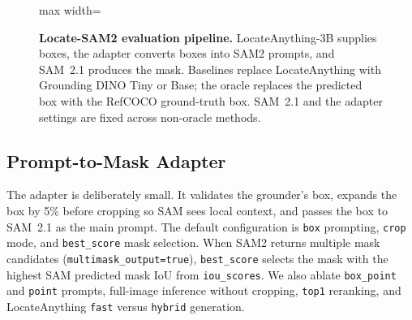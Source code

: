 \documentclass[11pt,a4paper]{article}
\begin{document}
\begin{figure}[t]
  \centering
  \begin{adjustbox}{max width=\textwidth}
  \end{adjustbox}
  \caption{%
    \textbf{Locate-SAM2 evaluation pipeline.}
    LocateAnything-3B supplies boxes, the adapter converts boxes into SAM2 prompts, and SAM~2.1 produces the mask.
    Baselines replace LocateAnything with Grounding DINO Tiny or Base; the oracle replaces the predicted box with the RefCOCO ground-truth box.
    SAM~2.1 and the adapter settings are fixed across non-oracle methods.}
  \label{fig:arch}
\end{figure}

\subsection{Prompt-to-Mask Adapter}
\label{sec:adapter}

The adapter is deliberately small.
It validates the grounder's box, expands the box by 5\% before cropping so SAM sees local context, and passes the box to SAM~2.1 as the main prompt.
The default configuration is \texttt{box} prompting, \texttt{crop} mode, and \texttt{best\_score} mask selection.
When SAM2 returns multiple mask candidates (\texttt{multimask\_output=true}), \texttt{best\_score} selects the mask with the highest SAM predicted mask IoU from \texttt{iou\_scores}.
We also ablate \texttt{box\_point} and \texttt{point} prompts, full-image inference without cropping, \texttt{top1} reranking, and LocateAnything \texttt{fast} versus \texttt{hybrid} generation.
\end{document}
